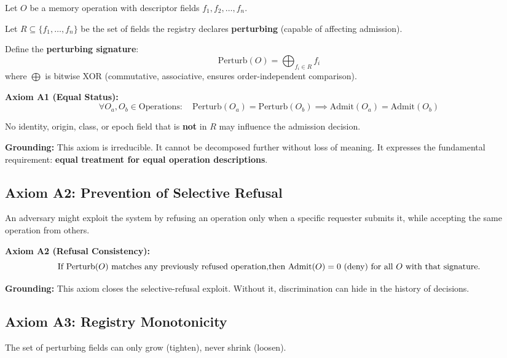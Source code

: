 \documentclass[11pt,oneside]{article}
\begin{document}
Let $O$ be a memory operation with descriptor fields $f_1, f_2, \ldots, f_n$.

Let $R \subseteq \{f_1, \ldots, f_n\}$ be the set of fields the registry declares \textbf{perturbing} (capable of affecting admission).

Define the \textbf{perturbing signature}:
\[
\text{Perturb}(O) = \bigoplus_{f_i \in R} f_i
\]
where $\bigoplus$ is bitwise XOR (commutative, associative, ensures order-independent comparison).

\begin{boxed}
\textbf{Axiom A1 (Equal Status):}
\[
\forall O_a, O_b \in \text{Operations}: \quad \text{Perturb}(O_a) = \text{Perturb}(O_b) \implies \text{Admit}(O_a) = \text{Admit}(O_b)
\]

No identity, origin, class, or epoch field that is \textbf{not} in $R$ may influence the admission decision.
\end{boxed}

\textbf{Grounding:} This axiom is irreducible. It cannot be decomposed further without loss of meaning. It expresses the fundamental requirement: \textbf{equal treatment for equal operation descriptions}.

\subsection{Axiom A2: Prevention of Selective Refusal}

An adversary might exploit the system by refusing an operation only when a specific requester submits it, while accepting the same operation from others.

\begin{boxed}
\textbf{Axiom A2 (Refusal Consistency):}
\[
\text{If } \text{Perturb}(O) \text{ matches any previously refused operation,} \\
\text{then } \text{Admit}(O) = 0 \text{ (deny)} \text{ for all } O \text{ with that signature.}
\]
\end{boxed}

\textbf{Grounding:} This axiom closes the selective-refusal exploit. Without it, discrimination can hide in the history of decisions.

\subsection{Axiom A3: Registry Monotonicity}

The set of perturbing fields can only grow (tighten), never shrink (loosen).
\end{document}
